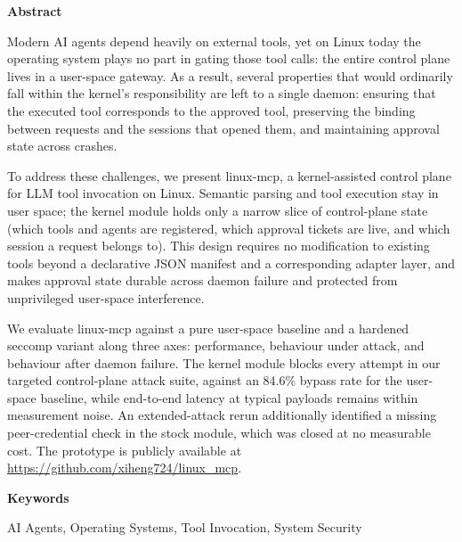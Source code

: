 \onehalfspacing
{} %
{\fontsize{16pt}{30pt}\selectfont \noindent\textbf{Abstract}}
\vspace{0.5cm}
{\fontsize{12pt}{18pt}\selectfont

Modern AI agents depend heavily on external tools, yet on Linux today the operating system plays no part in gating those tool calls: the entire control plane lives in a user-space gateway.
As a result, several properties that would ordinarily fall within the kernel's responsibility are left to a single daemon: ensuring that the executed tool corresponds to the approved tool, preserving the binding between requests and the sessions that opened them, and maintaining approval state across crashes.

To address these challenges, we present linux-mcp, a kernel-assisted control plane for LLM tool invocation on Linux.
Semantic parsing and tool execution stay in user space; the kernel module holds only a narrow slice of control-plane state (which tools and agents are registered, which approval tickets are live, and which session a request belongs to).
This design requires no modification to existing tools beyond a declarative JSON manifest and a corresponding adapter layer, and makes approval state durable across daemon failure and protected from unprivileged user-space interference.

We evaluate linux-mcp against a pure user-space baseline and a hardened seccomp variant along three axes: performance, behaviour under attack, and behaviour after daemon failure.
The kernel module blocks every attempt in our targeted control-plane attack suite, against an 84.6\% bypass rate for the user-space baseline, while end-to-end latency at typical payloads remains within measurement noise.
An extended-attack rerun additionally identified a missing peer-credential check in the stock module, which was closed at no measurable cost.
The prototype is publicly available at \url{https://github.com/xiheng724/linux_mcp}.

}
\vspace{0.5cm}
{\fontsize{16pt}{30pt}\selectfont \noindent\textbf{Keywords}}
\vspace{0.5cm}
{\fontsize{12pt}{18pt}\selectfont

AI Agents, Operating Systems, Tool Invocation, System Security

}


